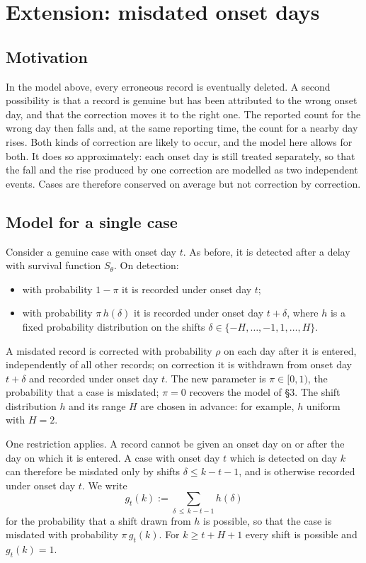 \documentclass[11pt,a4paper]{article}
\begin{document}
\section{Extension: misdated onset days}\label{sec:misdating}

\subsection{Motivation}

In the model above, every erroneous record is eventually deleted. A second
possibility is that a record is genuine but has been attributed to the wrong
onset day, and that the correction moves it to the right one. The reported
count for the wrong day then falls and, at the same reporting time, the count
for a nearby day rises. Both kinds of correction are likely to occur, and the
model here allows for both. It does so approximately: each onset day is still
treated separately, so that the fall and the rise produced by one correction
are modelled as two independent events. Cases are therefore conserved on
average but not correction by correction.

\subsection{Model for a single case}

Consider a genuine case with onset day $t$. As before, it is detected after a
delay with survival function $S_\theta$. On detection:
\begin{itemize}[itemsep=2pt]
\item with probability $1-\pi$ it is recorded under onset day $t$;
\item with probability $\pi\,h(\delta)$ it is recorded under onset day
$t+\delta$, where $h$ is a fixed probability distribution on the shifts
$\delta\in\{-H,\dots,-1,1,\dots,H\}$.
\end{itemize}
A misdated record is corrected with probability $\rho$ on each day after it is
entered, independently of all other records; on correction it is withdrawn from
onset day $t+\delta$ and recorded under onset day $t$. The new parameter is
$\pi\in[0,1)$, the probability that a case is misdated; $\pi=0$ recovers the
model of \S3. The shift distribution $h$ and its range $H$ are chosen in
advance: for example, $h$ uniform with $H=2$.

One restriction applies. A record cannot be given an onset day on or after the
day on which it is entered. A case with onset day $t$ which is detected on day
$k$ can therefore be misdated only by shifts $\delta\le k-t-1$, and is otherwise
recorded under onset day $t$. We write
\begin{equation}\label{eq:gshift}
g_t(k) := \sum_{\delta\,\le\, k-t-1} h(\delta)
\end{equation}
for the probability that a shift drawn from $h$ is possible, so that the case
is misdated with probability $\pi\,g_t(k)$. For $k\ge t+H+1$ every shift is
possible and $g_t(k)=1$.
\end{document}
